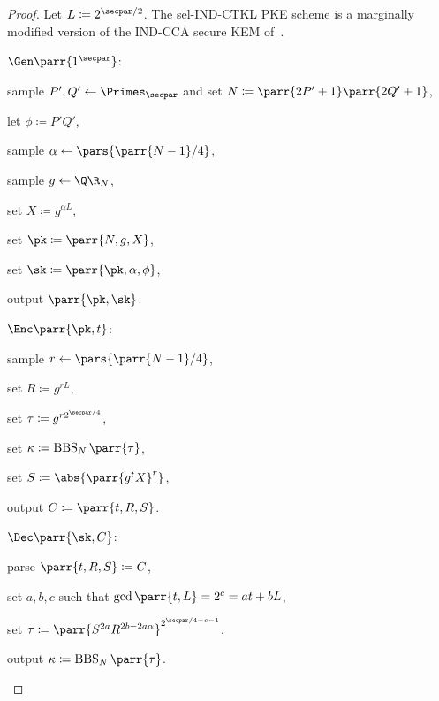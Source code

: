 \begin{proof}
    Let \(L \coloneqq 2^{\secpar/2}\).
    The sel-IND-CTKL PKE scheme is a marginally modified version of the IND-CCA secure KEM of~\textcite{EC:HofKil09}.
    \begin{sitemize}
        \item \(\Gen\parr{1^\secpar}\):
        \begin{sitemize}
            \item sample \(P',Q' \gets \Primes_\secpar\) and set \(N \coloneqq \parr{2P'+1} \parr{2Q'+1}\),
            \item let \(\phi \coloneqq P'Q'\),
            \item sample \(\alpha \gets \pars{\parr{N-1}/4}\),
            \item sample \(g \gets \Q\R_N\),
            \item set \(X \coloneqq g^{\alpha L}\),
            \item set \(\pk \coloneqq \parr{N,g,X}\),
            \item set \(\sk \coloneqq \parr{\pk,\alpha,\phi}\),
            \item output \(\parr{\pk,\sk}\).
        \end{sitemize}
        \item \(\Enc\parr{\pk,t}\):
        \begin{sitemize}
            \item sample \(r \gets \pars{\parr{N-1}/4}\),
            \item set \(R \coloneqq g^{r L}\),
            \item set \(\tau \coloneqq g^{r 2^{\secpar/4}}\),
            \item set \(\kappa \coloneqq \operatorname{BBS}_N\parr{\tau}\),
            \item set \(S \coloneqq \abs{\parr{g^t X}^r}\),
            \item output \(C \coloneqq \parr{t,R,S}\).
        \end{sitemize}
        \item \(\Dec\parr{\sk,C}\):
        \begin{sitemize}
            \item parse \(\parr{t,R,S} \coloneqq C\),
            \item set \(a,b,c\) such that \(\gcd\parr{t,L} = 2^c = a t + b L\),
            \item set \(\tau \coloneqq \parr{S^{2a} R^{2b-2a\alpha}}^{2^{\secpar/4-c-1}}\),
            \item output \(\kappa \coloneqq \operatorname{BBS}_N\parr{\tau}\).
        \end{sitemize}


\end{sitemize}
\end{proof}
